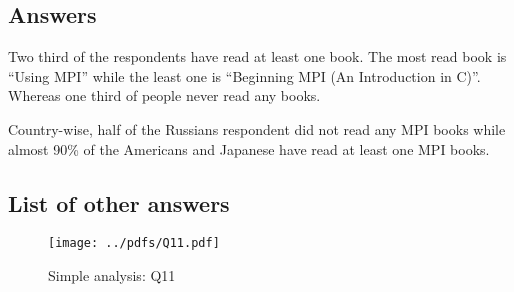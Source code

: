 
\subsection{Answers}



Two third of the respondents have read at least one book. The most
read book is ``Using MPI'' while the least one is ``Beginning MPI (An
Introduction in C)''. Whereas one third of people never read any books. 

Country-wise, half of the Russians respondent did not read any MPI
books while almost 90\% of the Americans and Japanese have read at
least one MPI books. 

\subsection{List of other answers}
\begin{itemize}

\end{itemize}

\begin{figure}[htb]
\begin{center}
\texttt{[image: ../pdfs/Q11.pdf]}
\caption{Simple analysis: Q11}
\label{fig:Q11}
\end{center}
\end{figure}


